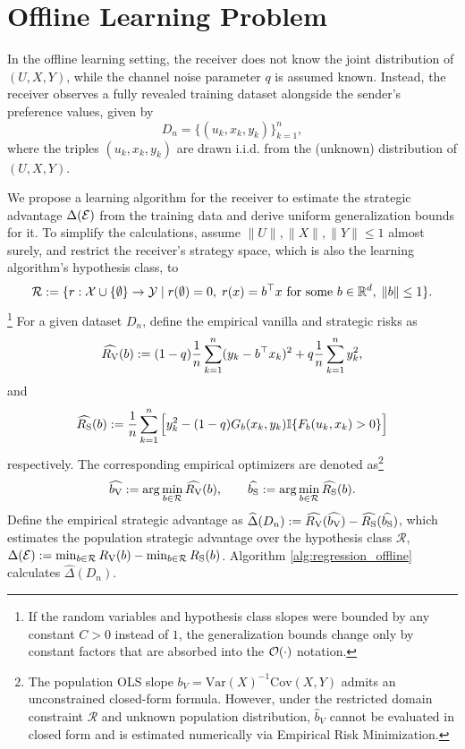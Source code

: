 \section{Offline Learning Problem}\label{sec:offline_learning}

In the offline learning setting, the receiver does not know the joint distribution of $(U,X,Y)$, while the channel noise parameter $q$ is assumed known. Instead, the receiver observes a fully revealed training dataset alongside the sender's preference values, given by
\begin{equation*}
    D_n=\{(u_k,x_k,y_k)\}_{k=1}^n,
\end{equation*}
where the triples $(u_k,x_k,y_k)$ are drawn i.i.d. from the (unknown) distribution of $(U,X,Y)$.

We propose a learning algorithm for the receiver to estimate the strategic advantage $\Delta(\mathcal{E})$ from the training data and derive uniform generalization bounds for it. To simplify the calculations, assume $\|U\|,\|X\|,\|Y\|\le 1$ almost surely, and restrict the receiver's strategy space, which is also the learning algorithm's hypothesis class, to
\begin{equation*}
    \mathcal{R}:=\{r:\mathcal{X}\cup\{\emptyset\}\to\mathcal{Y}\mid r(\emptyset)=0,\; r(x)=b^\top x\text{ for some }b\in\mathbb{R}^d,\; \|b\|\le 1\}.
\end{equation*}
\footnote{If the random variables and hypothesis class slopes were bounded by any constant $C>0$ instead of $1$, the generalization bounds change only by constant factors that are absorbed into the $\mathcal{O}(\cdot)$ notation.}
For a given dataset $D_n$, define the empirical vanilla and strategic risks as
\begin{equation*}
    \widehat{R_{\mathrm{V}}}(b):=(1-q)\frac{1}{n}\sum_{k=1}^n (y_k - b^\top x_k)^2 + q\frac{1}{n}\sum_{k=1}^n y_k^2,
\end{equation*}
and
\begin{equation*}
    \widehat{R_{\mathrm{S}}}(b):=\frac{1}{n}\sum_{k=1}^n\Big[y_k^2 - (1-q)G_b(x_k, y_k)\mathbb{I}\{F_b(u_k, x_k) > 0\}\Big]
\end{equation*}
respectively. The corresponding empirical optimizers are denoted as\footnote{The population OLS slope $b_V = \mathrm{Var}(X)^{-1}\mathrm{Cov}(X, Y)$ admits an unconstrained closed-form formula. However, under the restricted domain constraint $\mathcal{R}$ and unknown population distribution, $\widehat{b}_V$ cannot be evaluated in closed form and is estimated numerically via Empirical Risk Minimization.}
\begin{equation*}
    \widehat{b_{\mathrm{V}}}:=\arg\min_{b\in\mathcal{R}}\widehat{R_{\mathrm{V}}}(b),\qquad \widehat{b_{\mathrm{S}}}:=\arg\min_{b\in\mathcal{R}}\widehat{R_{\mathrm{S}}}(b).
\end{equation*}
Define the empirical strategic advantage as $\widehat{\Delta}(D_n):=\widehat{R_{\mathrm{V}}}(\widehat{b_{\mathrm{V}}})-\widehat{R_{\mathrm{S}}}(\widehat{b_{\mathrm{S}}})$, which estimates the population strategic advantage over the hypothesis class $\mathcal{R}$, $\Delta(\mathcal{E}) := \min_{b \in \mathcal{R}} R_{\mathrm{V}}(b) - \min_{b \in \mathcal{R}} R_{\mathrm{S}}(b)$. Algorithm \ref{alg:regression_offline} calculates $\widehat{\Delta}(D_n)$.

